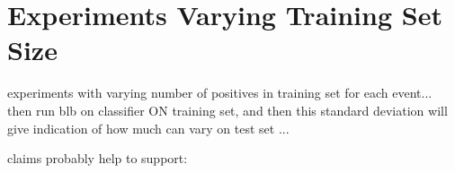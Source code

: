 \section{Experiments Varying Training Set Size}

experiments with varying number of positives in training set 
for each event... then run blb on classifier ON training set, 
and then this standard deviation will give indication of how much
can vary on test set ...

claims probably help to support: \cite{elizalde2012there}